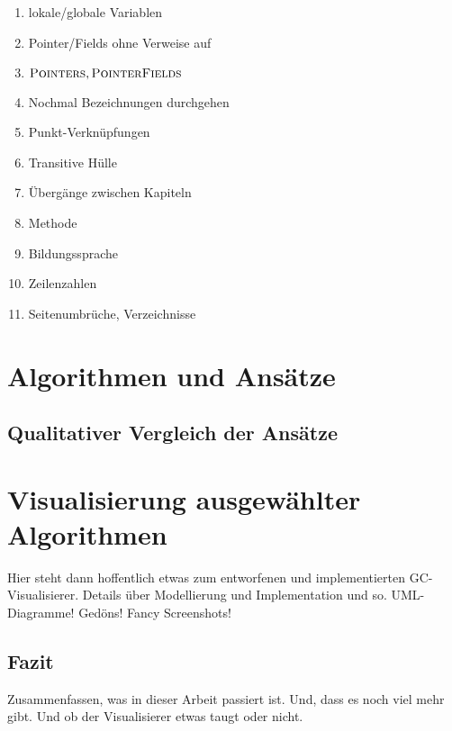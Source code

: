 
\listfiles


\listoftodos

\begin{enumerate}
	\item lokale/globale Variablen
	\item Pointer/Fields ohne Verweise auf \Roots
	\item $\textsc{Pointers}, \textsc{PointerFields}$
	\item Nochmal Bezeichnungen durchgehen
	\item Punkt-Verknüpfungen
	\item Transitive Hülle
	\item Übergänge zwischen Kapiteln
	\item Methode
	\item Bildungssprache
	\item Zeilenzahlen
	\item Seitenumbrüche, Verzeichnisse
\end{enumerate}



\cleardoublepage

\setcounter{page}{1}
\pagestyle{maincontentstyle}


\part{Algorithmen und Ansätze}




\chapter{Qualitativer Vergleich der Ansätze}		%

\part{Visualisierung ausgewählter Algorithmen}
Hier steht dann hoffentlich etwas zum entworfenen und implementierten GC-Visualisierer. Details über Modellierung und Implementation und so. UML-Diagramme! Gedöns! Fancy Screenshots!
%
\cleardoublepage

\chapter{Fazit}
Zusammenfassen, was in dieser Arbeit passiert ist.
Und, dass es noch viel mehr gibt.
Und ob der Visualisierer etwas taugt oder nicht.




